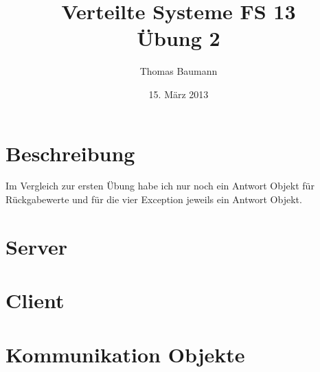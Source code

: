 \documentclass[10pt]{article}
\title{
	\vspace{5cm}
	Verteilte Systeme FS 13\\
	Übung 2
}
\author{Thomas Baumann}
\date{15. März 2013}
\let\stdsection\section{}
\renewcommand{\section}{\newpage\stdsection}
\begin{document}
\maketitle
\thispagestyle{fancy}

\newpage

\tableofcontents	  	


\newpage
\setcounter{page}{1}

\section{Beschreibung}
Im Vergleich zur ersten Übung habe ich nur noch ein Antwort Objekt für Rückgabewerte und für die vier Exception jeweils ein Antwort Objekt.

\section{Server}



\section{Client}



\section{Kommunikation Objekte}
\end{document}
